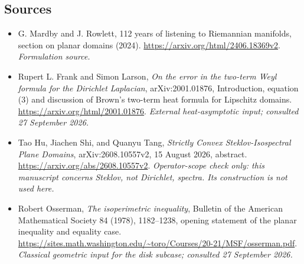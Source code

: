 \documentclass[11pt]{article}
\begin{document}
\subsection{Sources}
\begin{itemize}
\item[S1]G. Mardby and J. Rowlett, 112 years of listening to Riemannian manifolds, section on planar domains (2024).
\url{https://arxiv.org/html/2406.18369v2}.
\textit{Formulation source.}
\item[E1]Rupert L. Frank and Simon Larson,
\emph{On the error in the two-term Weyl formula for the Dirichlet Laplacian},
arXiv:2001.01876, Introduction, equation (3) and discussion of Brown's
two-term heat formula for Lipschitz domains.
\url{https://arxiv.org/html/2001.01876}.
\textit{External heat-asymptotic input; consulted 27 September 2026.}
\item[E2]Tao Hu, Jiachen Shi, and Quanyu Tang,
\emph{Strictly Convex Steklov-Isospectral Plane Domains},
arXiv:2608.10557v2, 15 August 2026, abstract.
\url{https://arxiv.org/abs/2608.10557v2}.
\textit{Operator-scope check only: this manuscript concerns Steklov,
not Dirichlet, spectra. Its construction is not used here.}
\item[E3]Robert Osserman, \emph{The isoperimetric inequality},
Bulletin of the American Mathematical Society 84 (1978), 1182--1238,
opening statement of the planar inequality and equality case.
\url{https://sites.math.washington.edu/~toro/Courses/20-21/MSF/osserman.pdf}.
\textit{Classical geometric input for the disk subcase; consulted
27 September 2026.}
\end{itemize}
\end{document}

